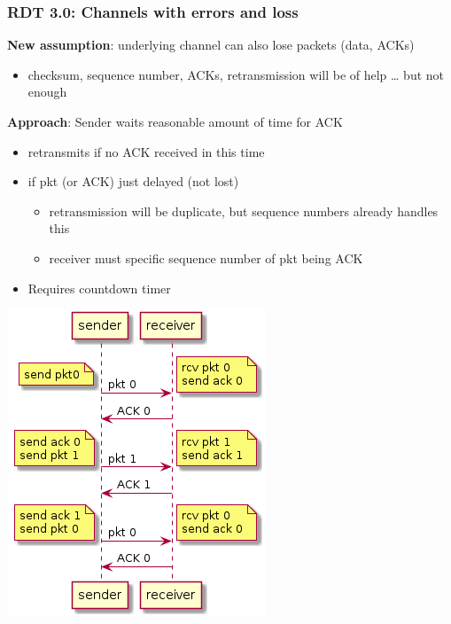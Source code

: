 \documentclass[11pt]{article}
\begin{document}
\subsubsection{RDT 3.0: Channels with errors and loss}
\label{sec:org012471b}

\textbf{New assumption}: underlying channel can also lose packets (data,
ACKs)
\begin{itemize}
\item checksum, sequence number, ACKs, retransmission will be of help
\ldots{} but not enough
\end{itemize}

\textbf{Approach}: Sender waits reasonable amount of time for ACK
\begin{itemize}
\item retransmits if no ACK received in this time
\item if pkt (or ACK) just delayed (not lost)
\begin{itemize}
\item retransmission will be duplicate, but sequence numbers already
handles this
\item receiver must specific sequence number of pkt being ACK
\end{itemize}
\item Requires countdown timer
\end{itemize}



\begin{center}
\includegraphics[width=.9\linewidth]{RDT3.0.png}
\end{center}
\end{document}

